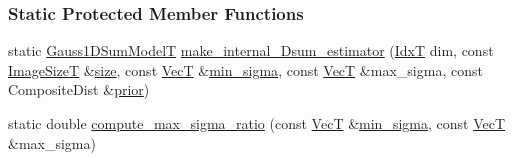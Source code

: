 \subsubsection*{Static Protected Member Functions}
\begin{DoxyCompactItemize}
\item 
static \hyperlink{classmappel_1_1Gauss2DsModel_a23ae68443a62f76405e6f08f6dec4fb7}{Gauss1\+D\+Sum\+ModelT} \hyperlink{classmappel_1_1Gauss2DsModel_a199ce5ccefd43d8bf4b6d0b076fca918}{make\+\_\+internal\+\_\+Dsum\+\_\+estimator} (\hyperlink{namespacemappel_ab17ec0f30b61ece292439d7ece81d3a8}{IdxT} dim, const \hyperlink{classmappel_1_1ImageFormat2DBase_a49cccf61eb2a768a202634d27fcd81d5}{Image\+SizeT} \&\hyperlink{classmappel_1_1ImageFormat2DBase_a3be77d2aa6ec9f3815322732950c2a60}{size}, const \hyperlink{namespacemappel_a2225ad69f358daa3f4f99282a35b9a3a}{VecT} \&\hyperlink{classmappel_1_1Gauss2DsModel_a8a97d37d210c1d161e4bc32c3a7b20dc}{min\+\_\+sigma}, const \hyperlink{namespacemappel_a2225ad69f358daa3f4f99282a35b9a3a}{VecT} \&max\+\_\+sigma, const Composite\+Dist \&\hyperlink{classmappel_1_1PointEmitterModel_a393839f8eb1dd3d61c9369377742ba0e}{prior})
\item 
static double \hyperlink{classmappel_1_1Gauss2DsModel_ad4bdfddccbc2a1053ac1f10199a4cb3b}{compute\+\_\+max\+\_\+sigma\+\_\+ratio} (const \hyperlink{namespacemappel_a2225ad69f358daa3f4f99282a35b9a3a}{VecT} \&\hyperlink{classmappel_1_1Gauss2DsModel_a8a97d37d210c1d161e4bc32c3a7b20dc}{min\+\_\+sigma}, const \hyperlink{namespacemappel_a2225ad69f358daa3f4f99282a35b9a3a}{VecT} \&max\+\_\+sigma)
\end{DoxyCompactItemize}
